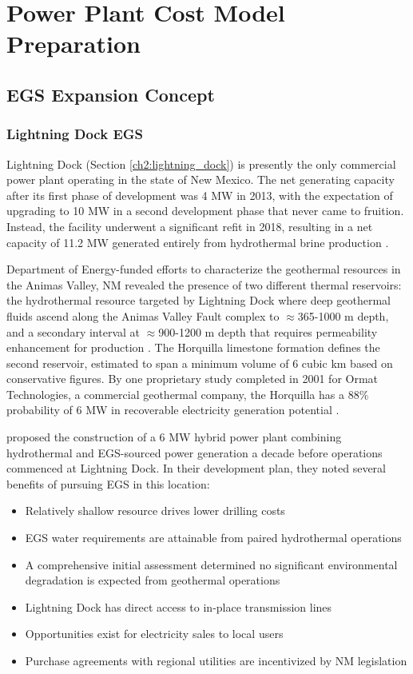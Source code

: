\chapter{Power Plant Cost Model Preparation}\label{ch4:cm_prep}

\section{EGS Expansion Concept}\label{ch4:cm_concept}
\subsection{Lightning Dock EGS}

Lightning Dock (Section \ref{ch2:lightning_dock}) is presently the only commercial power plant operating in the state of New Mexico. The net generating capacity after its first phase of development was 4 MW in 2013, with the expectation of upgrading to 10 MW in a second development phase that never came to fruition. Instead, the facility underwent a significant refit in 2018, resulting in a net capacity of 11.2 MW generated entirely from hydrothermal brine production \citep{bonafin_repowering_2019}. 

Department of Energy-funded efforts to characterize the geothermal resources in the Animas Valley, NM revealed the presence of two different thermal reservoirs: the hydrothermal resource targeted by Lightning Dock where deep geothermal fluids ascend along the Animas Valley Fault complex to $\approx$365-1000 m depth, and a secondary interval at $\approx$900-1200 m depth that requires permeability enhancement for production \citep{schochet_development_2001}. The Horquilla limestone formation defines the second reservoir, estimated to span a minimum volume of 6 cubic km based on conservative figures. By one proprietary study completed in 2001 for Ormat Technologies, a commercial geothermal company, the Horquilla has a 88\% probability of 6 MW in recoverable electricity generation potential \citep{schochet_development_2001}.

\citet{schochet_development_2001} proposed the construction of a 6 MW hybrid power plant combining hydrothermal and EGS-sourced power generation a decade before operations commenced at Lightning Dock. In their development plan, they noted several benefits of pursuing EGS in this location:
\begin{itemize}[itemsep=2pt]\label{ch4:ld_egs_support}
    \item Relatively shallow resource drives lower drilling costs
    \item EGS water requirements are attainable from paired hydrothermal operations
    \item A comprehensive initial assessment determined no significant environmental degradation is expected from geothermal operations
    \item Lightning Dock has direct access to in-place transmission lines  
    \item Opportunities exist for electricity sales to local users
    \item Purchase agreements with regional utilities are incentivized by NM legislation
\end{itemize}

